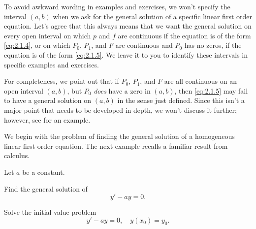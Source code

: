 To avoid awkward wording in examples and exercises, we won't specify
the interval $(a,b)$ when we ask for the general solution of a
specific linear first order equation. Let's agree that this always
means that we want the general solution on every open interval on
which $p$ and $f$ are continuous if the equation is of the form
\eqref{eq:2.1.4}, or on which $P_0$, $P_1$, and $F$ are continuous and
$P_0$ has no zeros, if the equation is of the form \eqref{eq:2.1.5}. We
leave it to you to identify these intervals in specific examples and
exercises.


For completeness, we point out that if $P_0$, $P_1$, and $F$ are all
continuous on an open interval $(a,b)$, but $P_0$ \emph{\color{blue}does} have a
zero in $(a,b)$, then \eqref{eq:2.1.5} may fail to have a general
solution on $(a,b)$ in the sense just defined. Since this isn't  a
major point that needs to be developed in depth, we won't discuss it
further; however, see  for an example.


We begin with the problem of finding the general solution of
a homogeneous linear first order equation.
The next example recalls a familiar result from calculus.


\begin{example}\label{example:2.1.3}
   Let $a$ be a constant.
\begin{alist}
\item %
Find the general solution of
\begin{equation}
y'-ay=0.\label{eq:2.1.6}
\end{equation}

\item %
Solve the initial value problem
\[
y'-ay=0,\quad y(x_0)=y_0.
\]
\end{alist}
\end{example}

